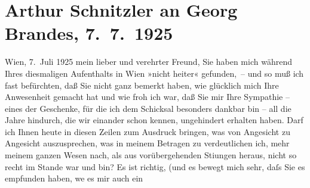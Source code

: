 

               \section[Arthur Schnitzler an Georg Brandes, 7. 7. 1925]{ Arthur Schnitzler an Georg Brandes, 7. 7. 1925}\nopagebreak{}\rehead{ }\begin{ledgroupsized}[t]{13cm}\normalsize\beginnumbering{} \toendnotes[C]{\smallbreak\pagebreak[2]} 
\toendnotes[C]{\smallbreak}\pstart
           \raggedleft{}{\pb}Wien, 7. Juli 1925\pend
           \pstart
           mein lieber und verehrter Freund, Sie haben mich während Ihres
               diesmaligen Aufenthalts in Wien »nicht heiter«
               gefunden, – und so muß ich fast befürchten, daß Sie nicht ganz bemerkt haben, wie
               glücklich mich Ihre Anwesenheit gemacht hat und wie froh ich war, daß Sie mir Ihre
               Sympathie – eines der Geschenke, für die ich dem Schicksal besonders dankbar bin –
               all die Jahre hindurch, die wir einander schon kennen, ungehindert erhalten haben.
               Darf ich Ihnen heute in diesen Zeilen zum Ausdruck bringen, was von Angesicht zu
               Angesicht auszusprechen, was in meinem Betragen zu verdeutlichen ich, mehr meinem
               ganzen Wesen nach, als aus vorübergehenden Sti{\geminationm}ungen
               heraus, nicht so recht im Stande war und bin? Es ist richtig, (und es bewegt mich
               sehr, daſs Sie es empfunden haben, we{\geminationn} es mir auch ein

\end{ledgroupsized}
